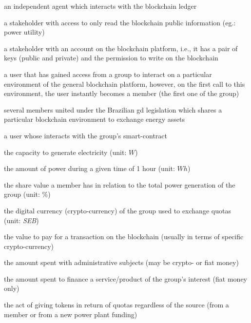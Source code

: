         \begin{description}[align=right, labelwidth=2.5cm, leftmargin=\labelwidth+\labelsep]
            \item[stakeholder] an independent agent which interacts with the blockchain ledger
            \item[reader] a stakeholder with access to only read the blockchain public information (eg.: power utility)
            \item[user] a stakeholder with an account on the blockchain platform, i.e., it has a pair of keys (public and private) and the permission to write on the blockchain
            \item[member] a user that has gained access from a group to interact on a particular environment of the general blockchain platform, however, on the first call to this environment, the user instantly becomes a member (the first one of the group)
            \item[group] several members united under the Brazilian \gls{gd} legislation which shares a particular blockchain environment to exchange energy assets
            \item[caller] a user whose interacts with the group's smart-contract
            \item[power] the capacity to generate electricity (unit: $W$)
            \item[energy] the amount of power during a given time of 1 hour (unit: $Wh$)
            \item[quota] the share value a member has in relation to the total power generation of the group (unit: \%)
            \item[token] the digital currency (crypto-currency) of the group used to exchange quotas (unit: \emph{SEB})
            \item[fee] the value to pay for a transaction on the blockchain (usually in terms of specific crypto-currency)
            \item[expense] the amount spent with administrative subjects (may be crypto- or fiat money)
            \item[cost] the amount spent to finance a service/product of the group's interest (fiat money only)
            \item[exchange] the act of giving tokens in return of quotas regardless of the source (from a member or from a new power plant funding)

\end{description}
